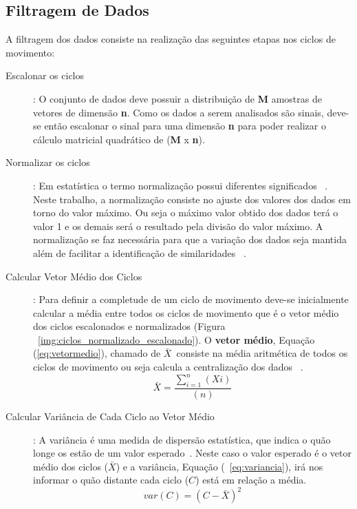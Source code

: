 \subsection{Filtragem de Dados}\label{section:filtro_dados}

A filtragem dos dados consiste na realização das seguintes etapas nos ciclos de movimento:
\begin{description}
	\item [Escalonar os ciclos]: O conjunto de dados deve possuir a distribuição de \textbf{M} amostras de vetores de dimensão \textbf{n}. Como os dados a serem analisados são sinais, deve-se então escalonar o sinal para uma dimensão \textbf{n} para poder realizar o cálculo matricial quadrático de (\textbf{M} x \textbf{n}).		
	\item [Normalizar os ciclos]: Em estatística o termo normalização possui diferentes significados ~\cite{statisticterms2006}. Neste trabalho, a normalização consiste no ajuste dos valores dos dados em torno do valor máximo. Ou seja o máximo valor obtido dos dados terá o valor 1 e os demais será o resultado pela divisão do valor máximo. A normalização se faz necessária para que a variação dos dados seja mantida além de facilitar a identificação de similaridades ~\cite{vicini2005}. 	
	\item [Calcular Vetor Médio dos Ciclos]: Para definir a completude de um ciclo de movimento deve-se inicialmente calcular a média entre todos os ciclos de movimento que é o vetor médio dos ciclos escalonados e normalizados (Figura ~\ref{img:ciclos_normalizado_escalonado}). O \textbf{vetor médio}, Equação (\ref{eq:vetormedio}), chamado de $\bar{X}$\ consiste na média aritmética de todos os ciclos de movimento ou seja calcula a centralização dos dados ~\cite{statisticshandbook2009}. 	
		\begin{equation}
			\bar{X}=\frac{\sum_{i=1}^{n}(Xi)}{(n)}
			\label{eq:vetormedio}
		\end{equation}
	\item [Calcular Variância de Cada Ciclo ao Vetor Médio]: A variância é uma medida de dispersão estatística, que indica o quão longe os estão de um valor esperado~\cite{statisticshandbook2009}. Neste caso o  valor esperado é o vetor médio dos ciclos ($\bar{X}$) e a variância, Equação (~\ref{eq:variancia}), irá nos informar o quão distante cada ciclo ($C$) está em relação a média.
		\begin{equation}
			var(C) = (C - \bar{X} )^2
			\label{eq:variancia}
		\end{equation}
		

\end{description}
